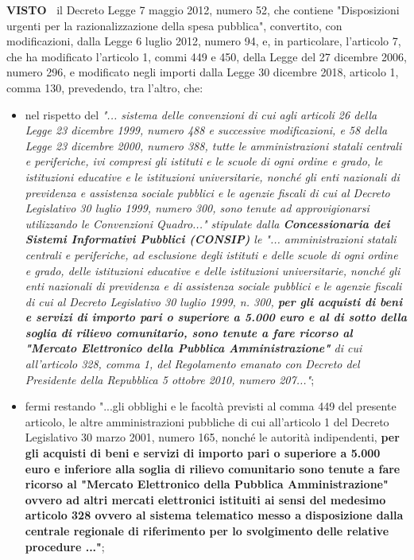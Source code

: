 \textbf{VISTO~}	il Decreto Legge 7 maggio 2012, numero 52, che contiene
"Disposizioni urgenti per la razionalizzazione della spesa pubblica",
convertito, con modificazioni, dalla Legge 6 luglio 2012, numero 94, e,
in particolare, l'articolo 7, che ha modificato l'articolo 1, commi
449 e 450, della Legge del 27 dicembre 2006, numero 296, e modificato
negli importi dalla Legge 30 dicembre 2018, articolo 1, comma 130,
prevedendo, tra l'altro, che:

\begin{itemize}
    
\item nel rispetto del \textit{"... sistema delle convenzioni di cui
agli articoli 26 della Legge 23 dicembre 1999, numero 488 e successive
modificazioni, e 58 della Legge 23 dicembre 2000, numero 388, tutte
le amministrazioni statali centrali e periferiche, ivi compresi gli
istituti e le scuole di ogni ordine e grado, le istituzioni educative e
le istituzioni universitarie, nonché gli enti nazionali di previdenza
e assistenza sociale pubblici e le agenzie fiscali di cui al Decreto
Legislativo 30 luglio 1999, numero 300, sono tenute ad approvigionarsi
utilizzando le Convenzioni Quadro..." stipulate dalla \textbf{Concessionaria
dei Sistemi Informativi Pubblici (CONSIP)} le "... amministrazioni
statali centrali e periferiche, ad esclusione degli istituti e delle
scuole di ogni ordine e grado, delle istituzioni educative e delle
istituzioni universitarie, nonché gli enti nazionali di previdenza e
di assistenza sociale pubblici e le agenzie fiscali di cui al Decreto
Legislativo 30 luglio 1999, n. 300, \textbf{per gli acquisti di beni e servizi
di importo pari o superiore a 5.000 euro e al di sotto della soglia di
rilievo comunitario, sono tenute a fare ricorso al "Mercato Elettronico
della Pubblica Amministrazione"} di cui all'articolo 328, comma 1,
del Regolamento emanato con Decreto del Presidente della Repubblica 5
ottobre 2010, numero 207..."};

\item fermi restando "...gli obblighi e le facoltà previsti al
comma 449 del presente articolo, le altre amministrazioni pubbliche di
cui all'articolo 1 del Decreto Legislativo 30 marzo 2001, numero 165,
nonché le autorità indipendenti, \textbf{per gli acquisti di beni e servizi di
importo pari o superiore a 5.000 euro e inferiore alla soglia di rilievo
comunitario sono tenute a fare ricorso al "Mercato Elettronico della
Pubblica Amministrazione" ovvero ad altri mercati elettronici istituiti
ai sensi del medesimo articolo 328 ovvero al sistema telematico messo a
disposizione dalla centrale regionale di riferimento per lo svolgimento
delle relative procedure ..."};

\end{itemize}

